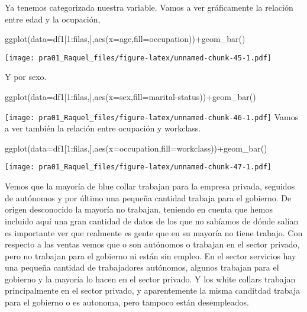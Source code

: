 \documentclass[]{article}
\newenvironment{Shaded}{\begin{snugshade}}{\end{snugshade}}
\newcommand{\DataTypeTok}[1]{\textcolor[rgb]{0.87,0.87,0.75}{#1}}
\newcommand{\DecValTok}[1]{\textcolor[rgb]{0.86,0.86,0.80}{#1}}
\newcommand{\KeywordTok}[1]{\textcolor[rgb]{0.94,0.87,0.69}{#1}}
\newcommand{\NormalTok}[1]{\textcolor[rgb]{0.80,0.80,0.80}{#1}}
\newcommand{\OperatorTok}[1]{\textcolor[rgb]{0.94,0.94,0.82}{#1}}
\newcommand{\StringTok}[1]{\textcolor[rgb]{0.80,0.58,0.58}{#1}}
\begin{document}
Ya tenemos categorizada nuestra variable. Vamos a ver gráficamente la
relación entre edad y la ocupación,

\begin{Shaded}
\begin{Highlighting}[]
\KeywordTok{ggplot}\NormalTok{(}\DataTypeTok{data=}\NormalTok{df1[}\DecValTok{1}\OperatorTok{:}\NormalTok{filas,],}\KeywordTok{aes}\NormalTok{(}\DataTypeTok{x=}\NormalTok{age,}\DataTypeTok{fill=}\NormalTok{occupation))}\OperatorTok{+}\KeywordTok{geom\_bar}\NormalTok{()}
\end{Highlighting}
\end{Shaded}

\texttt{[image: pra01\_Raquel\_files/figure-latex/unnamed-chunk-45-1.pdf]}

Y por sexo.

\begin{Shaded}
\begin{Highlighting}[]
\KeywordTok{ggplot}\NormalTok{(}\DataTypeTok{data=}\NormalTok{df1[}\DecValTok{1}\OperatorTok{:}\NormalTok{filas,],}\KeywordTok{aes}\NormalTok{(}\DataTypeTok{x=}\NormalTok{sex,}\DataTypeTok{fill=}\StringTok{\textasciigrave{}}\DataTypeTok{marital{-}status}\StringTok{\textasciigrave{}}\NormalTok{))}\OperatorTok{+}\KeywordTok{geom\_bar}\NormalTok{()}
\end{Highlighting}
\end{Shaded}

\texttt{[image: pra01\_Raquel\_files/figure-latex/unnamed-chunk-46-1.pdf]}
Vamos a ver también la relación entre ocupación y workclass.

\begin{Shaded}
\begin{Highlighting}[]
\KeywordTok{ggplot}\NormalTok{(}\DataTypeTok{data=}\NormalTok{df1[}\DecValTok{1}\OperatorTok{:}\NormalTok{filas,],}\KeywordTok{aes}\NormalTok{(}\DataTypeTok{x=}\NormalTok{occupation,}\DataTypeTok{fill=}\NormalTok{workclass))}\OperatorTok{+}\KeywordTok{geom\_bar}\NormalTok{()}
\end{Highlighting}
\end{Shaded}

\texttt{[image: pra01\_Raquel\_files/figure-latex/unnamed-chunk-47-1.pdf]}

Vemos que la mayoría de blue collar trabajan para la empresa privada,
seguidos de autónomos y por último una pequeña cantidad trabaja para el
gobierno. De origen desconocido la mayoría no trabajan, teniendo en
cuenta que hemos incluido aquí una gran cantidad de datos de los que no
sabíamos de dónde salían es importante ver que realmente es gente que en
su mayoría no tiene trabajo. Con respecto a las ventas vemos que o son
autónomos o trabajan en el sector privado, pero no trabajan para el
gobierno ni están sin empleo. En el sector servicios hay una pequeña
cantidad de trabajadores autónomos, algunos trabajan para el gobierno y
la mayoría lo hacen en el sector privado. Y los white collars trabajan
principalmente en el sector privado, y aparentemente la misma canditdad
trabaja para el gobierno o es autonoma, pero tampoco están desempleados.
\end{document}
